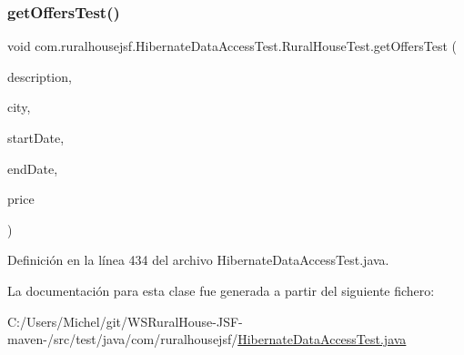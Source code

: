 \subsubsection{\texorpdfstring{getOffersTest()}{getOffersTest()}}
{\footnotesize\ttfamily void com.\+ruralhousejsf.\+Hibernate\+Data\+Access\+Test.\+Rural\+House\+Test.\+get\+Offers\+Test (\begin{DoxyParamCaption}\item[{String}]{description,  }\item[{String}]{city,  }\item[{@Java\+Time\+Conversion\+Pattern(\char`\"{}dd/MM/yyyy\char`\"{}) Local\+Date}]{start\+Date,  }\item[{@Java\+Time\+Conversion\+Pattern(\char`\"{}dd/MM/yyyy\char`\"{}) Local\+Date}]{end\+Date,  }\item[{double}]{price }\end{DoxyParamCaption})\hspace{0.3cm}{\ttfamily [package]}}



Definición en la línea 434 del archivo Hibernate\+Data\+Access\+Test.\+java.



La documentación para esta clase fue generada a partir del siguiente fichero\+:\begin{DoxyCompactItemize}
\item 
C\+:/\+Users/\+Michel/git/\+W\+S\+Rural\+House-\/\+J\+S\+F-\/maven-\//src/test/java/com/ruralhousejsf/\mbox{\hyperlink{_hibernate_data_access_test_8java}{Hibernate\+Data\+Access\+Test.\+java}}\end{DoxyCompactItemize}
